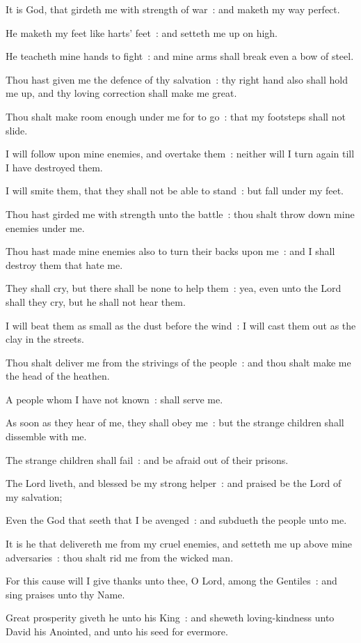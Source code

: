 It is God, that girdeth me with strength of war~: and maketh my way perfect.\par
{}He maketh my feet like harts' feet~: and setteth me up on high.\par
{}He teacheth mine hands to fight~: and mine arms shall break even a bow of steel.\par
{}Thou hast given me the defence of thy salvation~: thy right hand also shall hold me up, and thy loving correction shall make me great.\par
{}Thou shalt make room enough under me for to go~: that my footsteps shall not slide.\par
{}I will follow upon mine enemies, and overtake them~: neither will I turn again till I have destroyed them.\par
{}I will smite them, that they shall not be able to stand~: but fall under my feet.\par
{}Thou hast girded me with strength unto the battle~: thou shalt throw down mine enemies under me.\par
{}Thou hast made mine enemies also to turn their backs upon me~: and I shall destroy them that hate me.\par
{}They shall cry, but there shall be none to help them~: yea, even unto the Lord shall they cry, but he shall not hear them.\par
{}I will beat them as small as the dust before the wind~: I will cast them out as the clay in the streets.\par
{}Thou shalt deliver me from the strivings of the people~: and thou shalt make me the head of the heathen.\par
{}A people whom I have not known~: shall serve me.\par
{}As soon as they hear of me, they shall obey me~: but the strange children shall dissemble with me.\par
{}The strange children shall fail~: and be afraid out of their prisons.\par
{}The Lord liveth, and blessed be my strong helper~: and praised be the Lord of my salvation;\par
{}Even the God that seeth that I be avenged~: and subdueth the people unto me.\par
{}It is he that delivereth me from my cruel enemies, and setteth me up above mine adversaries~: thou shalt rid me from the wicked man.\par
{}For this cause will I give thanks unto thee, O Lord, among the Gentiles~: and sing praises unto thy Name.\par
{}Great prosperity giveth he unto his King~: and sheweth loving-kindness unto David his Anointed, and unto his seed for evermore.\par

